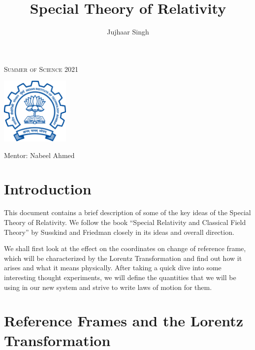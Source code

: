 \documentclass[12pt]{article}
\title{Special Theory of Relativity}
\author{
    Jujhaar Singh
}
\date{\formatdate{12}{6}{2021}}
\numberwithin{equation}{section}
\theoremstyle{plain}
\theoremstyle{definition}
\newcommand{\myfont}{\fontfamily{cmss}\selectfont}
\newcommand{\myfontb}[1]{\textbf{\myfont #1}}
\begin{document}

\begin{titlepage}
    \centering
    {\scshape\LARGE Summer of Science 2021 \par}
    \vspace{1.5cm}
    \includegraphics[width = 0.25\textwidth]
    {img/iitb_logo}\par
    \vspace{1cm}
    {\Huge \myfontb \@title \par}
    \vspace{3cm}
    {\Large\myfont
        \@author \par
        \large
        Mentor: Nabeel Ahmed
        \vfill
        {\large \@date \par}
    }\end{titlepage}

\setcounter{page}{2}
\pagebreak
\thispagestyle{empty}
\tableofcontents
\pagebreak

\setcounter{page}{1}


\section*{Introduction}
This document contains a brief description of some of the key ideas of the Special Theory of Relativity. We follow the book ``Special Relativity and Classical Field Theory'' by Susskind and Friedman closely in its ideas and overall direction.

We shall first look at the effect on the coordinates on change of reference frame, which will be characterized by the Lorentz Transformation and find out how it arises and what it means physically. After taking a quick dive into some interesting thought experiments, we will define the quantities that we will be using in our new system and strive to write laws of motion for them.

\pagebreak

\section{Reference Frames and the Lorentz Transformation}
\end{document}
